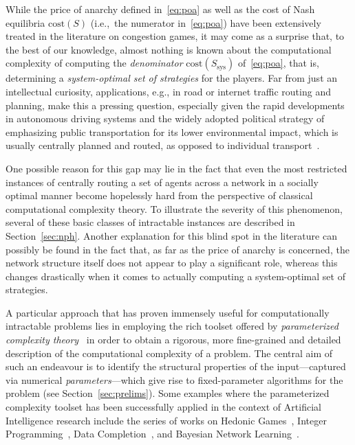 \documentclass[letterpaper]{article} %
\begin{document}
While the price of anarchy defined in~\eqref{eq:poa} as well as the cost of Nash equilibria $\mathrm{cost}(S)$ (i.e.,~the numerator in~\eqref{eq:poa}) have been extensively treated in the literature on congestion games, it may come as a surprise that, to the best of our knowledge, almost nothing is known about the computational complexity of computing the \emph{denominator} $\mathrm{cost}(S_\mathrm{sys})$ of~\eqref{eq:poa}, that is, determining a \emph{system-optimal set of strategies} for the players. Far from just an intellectual curiosity, applications, e.g., in road or internet traffic routing and planning, make this a pressing question, especially given the rapid developments in autonomous driving systems and the widely adopted political strategy of emphasizing public transportation for its lower environmental impact, which is usually centrally planned and routed, as opposed to individual transport~\cite{sharon2017real,sharon2017network,chen2020path,sharon2021alleviating,jalota2023balancing}. 

One possible reason for this gap may lie in the fact that even the most restricted instances of centrally routing a set of agents across a network in a socially optimal manner become hopelessly hard from the perspective of classical computational complexity theory. To illustrate the severity of this phenomenon, several of these basic classes of intractable instances are described in Section~\ref{sec:nph}.
Another explanation for this blind spot in the literature can possibly be found in the fact that, as far as the price of anarchy is concerned, the network structure itself does not appear to play a significant role, whereas this changes drastically when it comes to actually computing a system-optimal set of strategies.

A particular approach that has proven immensely useful for computationally intractable problems lies in employing the rich toolset offered by \emph{parameterized complexity theory}~\cite{DowneyF13,CyganFKLMPPS15} in order to obtain a rigorous, more fine-grained and detailed description of the computational complexity of a problem. The central aim of such an endeavour is to identify the structural properties of the input---captured via numerical \emph{parameters}---which give rise to fixed-parameter algorithms for the problem (see Section~\ref{sec:prelims}).
Some examples where the parameterized complexity toolset has been successfully applied in the context of Artificial Intelligence research include the series of works on Hedonic Games~\cite{BoehmerE20,BoehmerE20b,GanianHKSS22}, Integer Programming~\cite{GanianO18,EibenGKO19,DvorakEGKO21,ChanCKKP22}, Data Completion~\cite{GanianKOS18,DahiyaFPS21,GanianHKOS22,KoanaFN23}, and Bayesian Network Learning~\cite{OrdyniakS13,GruttemeierKM21,GanianK21,GruttemeierK22}. 
\end{document}
